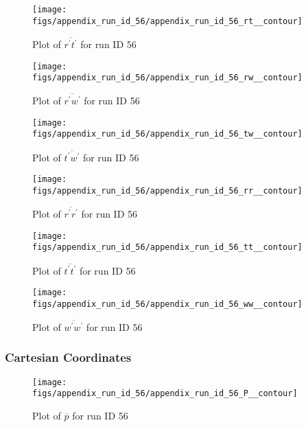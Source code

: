 \begin{figure}[H]
\centering
\texttt{[image: figs/appendix\_run\_id\_56/appendix\_run\_id\_56\_rt\_\_contour]}
\caption{Plot of $\overline{r^\prime t^\prime}$ for run ID 56}
\label{fig:appendix_run_id_56_rt__contour}
\end{figure}


\begin{figure}[H]
\centering
\texttt{[image: figs/appendix\_run\_id\_56/appendix\_run\_id\_56\_rw\_\_contour]}
\caption{Plot of $\overline{r^\prime w^\prime}$ for run ID 56}
\label{fig:appendix_run_id_56_rw__contour}
\end{figure}


\begin{figure}[H]
\centering
\texttt{[image: figs/appendix\_run\_id\_56/appendix\_run\_id\_56\_tw\_\_contour]}
\caption{Plot of $\overline{t^\prime w^\prime}$ for run ID 56}
\label{fig:appendix_run_id_56_tw__contour}
\end{figure}


\begin{figure}[H]
\centering
\texttt{[image: figs/appendix\_run\_id\_56/appendix\_run\_id\_56\_rr\_\_contour]}
\caption{Plot of $\overline{r^\prime r^\prime}$ for run ID 56}
\label{fig:appendix_run_id_56_rr__contour}
\end{figure}


\begin{figure}[H]
\centering
\texttt{[image: figs/appendix\_run\_id\_56/appendix\_run\_id\_56\_tt\_\_contour]}
\caption{Plot of $\overline{t^\prime t^\prime}$ for run ID 56}
\label{fig:appendix_run_id_56_tt__contour}
\end{figure}


\begin{figure}[H]
\centering
\texttt{[image: figs/appendix\_run\_id\_56/appendix\_run\_id\_56\_ww\_\_contour]}
\caption{Plot of $\overline{w^\prime w^\prime}$ for run ID 56}
\label{fig:appendix_run_id_56_ww__contour}
\end{figure}


\subsubsection{Cartesian Coordinates}
\begin{figure}[H]
\centering
\texttt{[image: figs/appendix\_run\_id\_56/appendix\_run\_id\_56\_P\_\_contour]}
\caption{Plot of $\overline{p}$ for run ID 56}
\label{fig:appendix_run_id_56_P__contour}
\end{figure}


